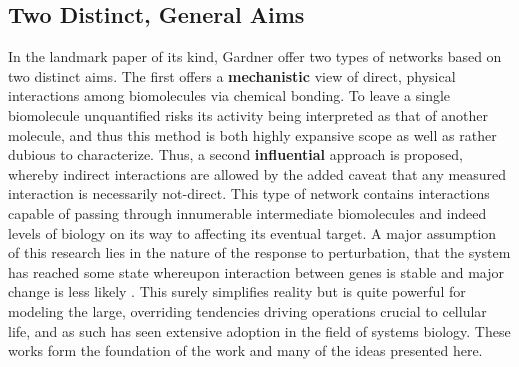 \subsection{Two Distinct, General Aims}
\label{sec:purpose}
In the landmark paper of its kind, Gardner \etal \cite{gardner2003inferring} offer two types of networks based on two distinct aims. The first offers a \textbf{mechanistic} view of direct, physical interactions among biomolecules via chemical bonding. To leave a single biomolecule unquantified risks its activity being interpreted as that of another molecule, and thus this method is both highly expansive scope as well as rather dubious to characterize. Thus, a second \textbf{influential} approach is proposed, whereby indirect interactions are allowed by the added caveat that any measured interaction is necessarily not-direct. This type of network contains interactions capable of passing through innumerable intermediate biomolecules and indeed levels of biology on its way to affecting its eventual target. A major assumption of this research lies in the nature of the response to perturbation, \ie that the system has reached some state whereupon interaction between genes is stable and major change is less likely \cite{gardner2003inferring, faith2007large}. This surely simplifies reality but is quite powerful for modeling the large, overriding tendencies driving operations crucial to cellular life, and as such has seen extensive adoption in the field of systems biology.  These works form the foundation of the work and many of the ideas presented here. 


